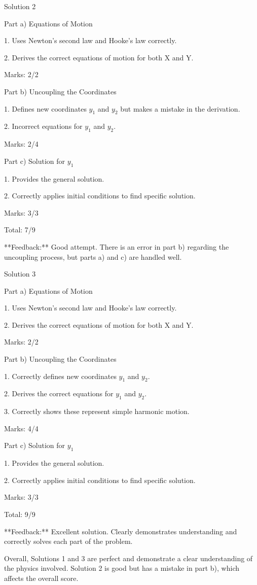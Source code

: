 \documentclass[a4paper,11pt]{article}
\begin{document}
Solution 2

Part a) Equations of Motion

1. Uses Newton's second law and Hooke's law correctly.

2. Derives the correct equations of motion for both X and Y.

Marks: 2/2

Part b) Uncoupling the Coordinates

1. Defines new coordinates \(y_1\) and \(y_2\) but makes a mistake in the derivation.

2. Incorrect equations for \(y_1\) and \(y_2\).

Marks: 2/4

Part c) Solution for \(y_1\)

1. Provides the general solution.

2. Correctly applies initial conditions to find specific solution.

Marks: 3/3

Total: 7/9

**Feedback:** Good attempt. There is an error in part b) regarding the uncoupling process, but parts a) and c) are handled well.

Solution 3

Part a) Equations of Motion

1. Uses Newton's second law and Hooke's law correctly.

2. Derives the correct equations of motion for both X and Y.

Marks: 2/2

Part b) Uncoupling the Coordinates

1. Correctly defines new coordinates \(y_1\) and \(y_2\).

2. Derives the correct equations for \(y_1\) and \(y_2\).

3. Correctly shows these represent simple harmonic motion.

Marks: 4/4

Part c) Solution for \(y_1\)

1. Provides the general solution.

2. Correctly applies initial conditions to find specific solution.

Marks: 3/3

Total: 9/9

**Feedback:** Excellent solution. Clearly demonstrates understanding and correctly solves each part of the problem.

Overall, Solutions 1 and 3 are perfect and demonstrate a clear understanding of the physics involved. Solution 2 is good but has a mistake in part b), which affects the overall score.
\end{document}
